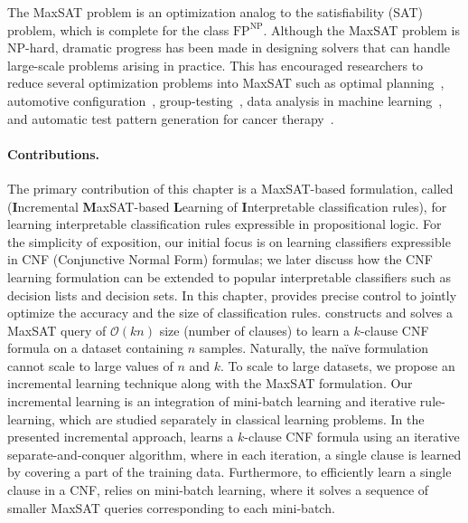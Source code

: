 The MaxSAT problem is an optimization analog to the satisfiability (SAT) problem, which is complete for the class $ \mathrm{FP}^{\mathrm{NP}} $. Although the MaxSAT problem is NP-hard, dramatic progress has been made in designing solvers that can handle large-scale problems arising in practice. This has encouraged researchers to reduce several optimization problems into MaxSAT such as  optimal planning~\cite{robinson2010partial}, automotive configuration~\cite{walter2013applications}, group-testing~\cite{CGSM2020}, data analysis in machine learning~\cite{berg2019applications}, and automatic test pattern generation for cancer therapy~\cite{lin2012application}. 



\paragraph{Contributions.} The primary contribution of this chapter is a MaxSAT-based formulation, called {\imli} (\textbf{I}ncremental \textbf{M}axSAT-based \textbf{L}earning of \textbf{I}nterpretable classification rules), for learning interpretable classification rules expressible in propositional logic. For the simplicity of exposition, our initial focus is on learning classifiers expressible in CNF (Conjunctive Normal Form) formulas; we later discuss how the CNF learning formulation can be extended to popular interpretable classifiers such as decision lists and decision sets. In this chapter, {\imli} provides precise control to jointly optimize the accuracy and the size of classification rules. {\imli} constructs and solves a MaxSAT query of $ \mathcal{O}(kn) $  size (number of clauses) to learn a $ k $-clause CNF formula on a dataset containing $ n $ samples. Naturally, the na\"ive formulation cannot scale to large values of $ n $ and $ k $. To scale {\imli} to large datasets, we propose an incremental learning technique along with the MaxSAT formulation. Our incremental learning is an integration of mini-batch learning and iterative rule-learning, which are studied separately in classical learning problems. In the presented incremental approach, {\imli} learns a $ k $-clause CNF formula using an iterative separate-and-conquer algorithm, where in each iteration, a single clause is learned by covering a part of the training data. Furthermore, to efficiently learn a single clause in a CNF, {\imli} relies on mini-batch learning, where it solves a sequence of smaller MaxSAT queries corresponding to each mini-batch. 



